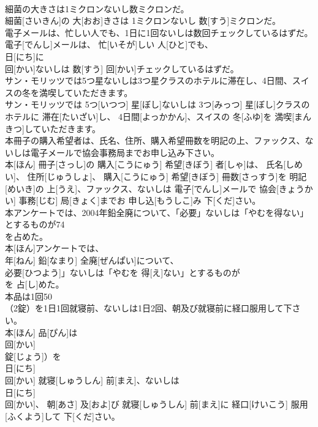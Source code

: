 \documentclass[8pt]{extreport}
\begin{document}
\begin{CJK}{UTF8}{min}
\\	細菌の大きさは1ミクロンないし数ミクロンだ。	
\\	細菌[さいきん]の 大[おお]きさは 1ミクロンないし 数[すう]ミクロンだ。
\\	電子メールは、忙しい人でも、1日に1回ないしは数回チェックしているはずだ。	
\\	電子[でんし]メールは、 忙[いそが]しい 人[ひと]でも、 
\\	日[にち]に 
\\	回[かい]ないしは 数[すう] 回[かい]チェックしているはずだ。
\\	サン・モリッツでは5つ星ないしは3つ星クラスのホテルに滞在し、4日間、スイスの冬を満喫していただきます。	
\\	サン・モリッツでは 5つ[いつつ] 星[ぼし]ないしは 3つ[みっつ] 星[ぼし]クラスのホテルに 滞在[たいざい]し、 4日間[よっかかん]、スイスの 冬[ふゆ]を 満喫[まんきつ]していただきます。
\\	本冊子の購入希望者は、氏名、住所、購入希望冊数を明記の上、ファックス、ないしは電子メールで協会事務局までお申し込み下さい。	
\\	本[ほん] 冊子[さっし]の 購入[こうにゅう] 希望[きぼう] 者[しゃ]は、 氏名[しめい]、 住所[じゅうしょ]、 購入[こうにゅう] 希望[きぼう] 冊数[さっすう]を 明記[めいき]の 上[うえ]、ファックス、ないしは 電子[でんし]メールで 協会[きょうかい] 事務[じむ] 局[きょく]までお 申し込[もうしこ]み 下[くだ]さい。
\\	本アンケートでは、2004年鉛全廃について、「必要」ないしは「やむを得ない」とするものが74
\\	を占めた。	
\\	本[ほん]アンケートでは、 
\\	年[ねん] 鉛[なまり] 全廃[ぜんぱい]について、
\\	必要[ひつよう]」ないしは「やむを 得[え]ない」とするものが 
\\	を 占[し]めた。
\\	本品は1回50
\\	（2錠）を1日1回就寝前、ないしは1日2回、朝及び就寝前に経口服用して下さい。	
\\	本[ほん] 品[ぴん]は 
\\	回[かい] 
\\	錠[じょう]）を 
\\	日[にち] 
\\	回[かい] 就寝[しゅうしん] 前[まえ]、ないしは 
\\	日[にち] 
\\	回[かい]、 朝[あさ] 及[およ]び 就寝[しゅうしん] 前[まえ]に 経口[けいこう] 服用[ふくよう]して 下[くだ]さい。

\end{CJK}
\end{document}
